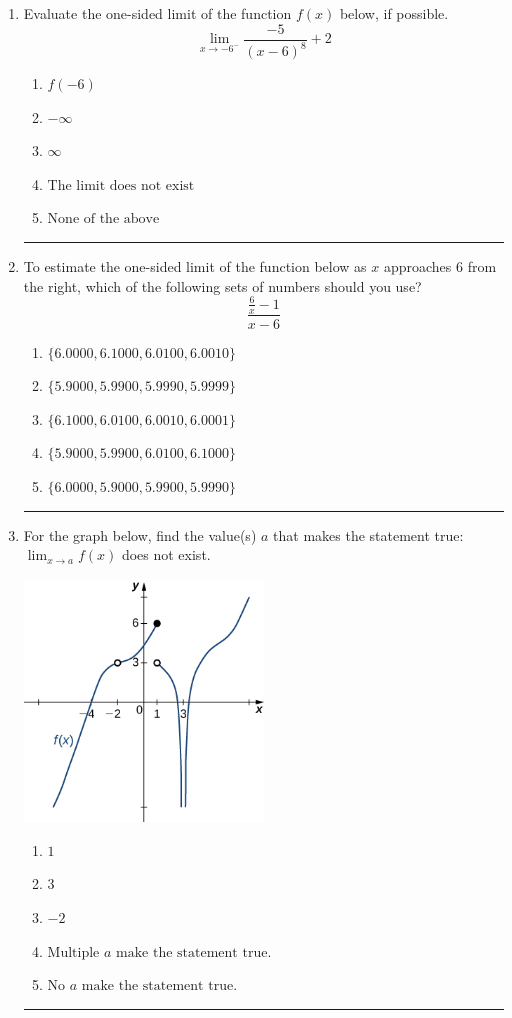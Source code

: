 \documentclass[14pt]{extbook}
\newcommand{\litem}[1]{\item#1\hspace*{-1cm}\rule{\textwidth}{0.4pt}}
\begin{document}
\begin{enumerate}
{\begin{enumerate}[label=\Alph*.]
\end{enumerate} }
\litem{
Evaluate the one-sided limit of the function $f(x)$ below, if possible.\[ \lim_{x \rightarrow -6^-} \frac{-5}{(x-6)^8}+2 \]\begin{enumerate}[label=\Alph*.]
\item \( f(-6) \)
\item \( -\infty \)
\item \( \infty \)
\item \( \text{The limit does not exist} \)
\item \( \text{None of the above} \)

\end{enumerate} }
\litem{
To estimate the one-sided limit of the function below as $x$ approaches 6 from the right, which of the following sets of numbers should you use?\[ \frac{\frac{6}{x} - 1}{x - 6} \]\begin{enumerate}[label=\Alph*.]
\item \( \{ 6.0000, 6.1000, 6.0100, 6.0010 \} \)
\item \( \{ 5.9000, 5.9900, 5.9990, 5.9999 \} \)
\item \( \{ 6.1000, 6.0100, 6.0010, 6.0001 \} \)
\item \( \{ 5.9000, 5.9900, 6.0100, 6.1000 \} \)
\item \( \{ 6.0000, 5.9000, 5.9900, 5.9990 \} \)

\end{enumerate} }
\litem{
For the graph below, find the value(s) $a$ that makes the statement true: $ \displaystyle \lim_{x \rightarrow a} f(x)$ does not exist.
\begin{center}
    \includegraphics[width=0.5\textwidth]{../Figures/evaluateLimitGraphicallyB.png}
\end{center}
\begin{enumerate}[label=\Alph*.]
\item \( 1 \)
\item \( 3 \)
\item \( -2 \)
\item \( \text{Multiple } a \text{ make the statement true}. \)
\item \( \text{No } a \text{ make the statement true}. \)


\end{enumerate}}
\end{enumerate}
\end{document}
